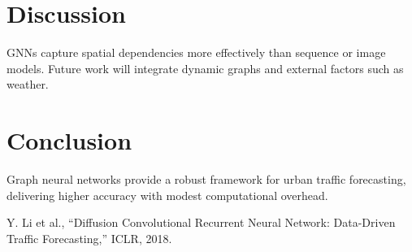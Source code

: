 \documentclass{article}
\begin{document}
\section{Discussion}
GNNs capture spatial dependencies more effectively than sequence or image models. Future work will integrate dynamic graphs and external factors such as weather.
\section{Conclusion}
Graph neural networks provide a robust framework for urban traffic forecasting, delivering higher accuracy with modest computational overhead.
\begin{thebibliography}{9}
 Y. Li et al., ``Diffusion Convolutional Recurrent Neural Network: Data-Driven Traffic Forecasting,'' ICLR, 2018.
\end{thebibliography}
\end{document}

